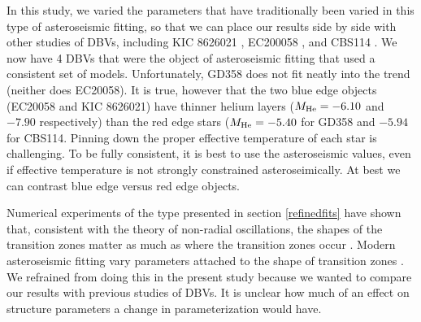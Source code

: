 \documentclass[12pt,preprint]{aastex}
\begin{document}
In this study, we varied the parameters that have traditionally been varied in this type of asteroseismic fitting, so that we can place our results side by side with other studies of DBVs, including KIC 8626021 \citep{Bischoff-Kim14}, EC200058 \citep{Bischoff-Kim11a}, and CBS114 \citep{Metcalfe05a}. We now have 4 DBVs that were the object of asteroseismic fitting that used a consistent set of models. Unfortunately, GD358 does not fit neatly into the trend (neither does EC20058). It is true, however that the two blue edge objects (EC20058 and KIC 8626021) have thinner helium layers ($M_{\rm He}=-6.10$ and $-7.90$ respectively) than the red edge stars ($M_{\rm He}=-5.40$ for GD358 and $-5.94$ for CBS114. Pinning down the proper effective temperature of each star is challenging. To be fully consistent, it is best to use the asteroseismic values, even if effective temperature is not strongly constrained asteroseimically. At best we can contrast blue edge versus red edge objects.

Numerical experiments of the type presented in section \ref{refinedfits} have shown that, consistent with the theory of non-radial oscillations, the shapes of the transition zones matter as much as where the transition zones occur \citep{Bischoff-Kim15}. Modern asteroseismic fitting vary parameters attached to the shape of transition zones \citep{Giammichele15}. We refrained from doing this in the present study because we wanted to compare our results with previous studies of DBVs. It is unclear how much of an effect on structure parameters a change in parameterization would have.
\end{document}
